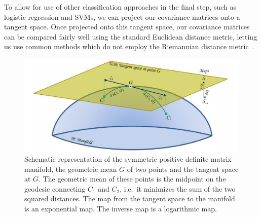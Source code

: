         To allow for use of other classification approaches in the final step, such as logistic regression and SVMs, we can project our covariance matrices onto a tangent space. Once projected onto this tangent space, our covariance matrices can be compared fairly well using the standard Euclidean distance metric, letting us use common methods which do not employ the Riemannian distance metric~\cite{congedo_riemannian_2017}.

        \begin{figure}[h]
            \centering
            \includegraphics[width=12cm]{img/riemannian-tangent-space.png}
            \caption{Schematic representation of the symmetric positive definite matrix manifold, the geometric mean $G$ of two points and the tangent space at $G$. The geometric mean of these points is the midpoint on the geodesic connecting $C_1$ and $C_2$, i.e.\ it minimizes the sum of the two squared distances. The map from the tangent space to the manifold is an exponential map. The inverse map is a logarithmic map.}\label{figure:tangent-space}
        \end{figure}

